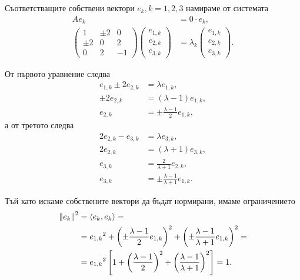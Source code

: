 \documentclass[
  headings=standardclasses,
  bibliography=totocnumbered,
]{scrartcl}
\begin{document}
\begin{solution}
  Съответстващите собствени вектори \( e_k, k = 1, 2, 3 \) намираме от системата
  \begingroup
  \allowdisplaybreaks
  \begin{align*}
    A e_k &= 0 \cdot e_k,
    \\
    \begin{pmatrix}
      1 & \pm 2 & 0 \\
      \pm 2 & 0 & 2 \\
      0 & 2 & -1
    \end{pmatrix}
    \begin{pmatrix}
      e_{1,k} \\ e_{2,k} \\ e_{3,k}
    \end{pmatrix}
    &=
    \lambda_k
    \begin{pmatrix}
      e_{1,k} \\ e_{2,k} \\ e_{3,k}
    \end{pmatrix}.
  \end{align*}
  \endgroup

  От първото уравнение следва
  \begin{align*}
    e_{1,k} \pm 2 e_{2,k} &= \lambda e_{1,k},
    \\
    \pm 2 e_{2,k} &= (\lambda - 1) e_{1,k},
    \\
    e_{2,k} &= \pm \frac {\lambda - 1} 2 e_{1,k},
  \end{align*}
  а от третото следва
  \begin{align*}
    2e_{2,k} - e_{3,k} &= \lambda e_{3,k},
    \\
    2 e_{2,k} &= (\lambda + 1) e_{3,k},
    \\
    e_{3,k} &= \frac 2 {\lambda + 1} e_{2,k},
    \\
    e_{3,k} &= \pm \frac {\lambda - 1} {\lambda + 1} e_{1,k}.
  \end{align*}

  Тъй като искаме собствените вектори да бъдат нормирани, имаме ограничението
  \begin{align*}
    {\left\Vert e_k \right\Vert}^2
    &=
    \left\langle e_k, e_k \right\rangle
    = \\ &=
    {e_{1,k}}^2 + {\left(\pm \frac {\lambda - 1} 2 e_{1,k} \right)}^2 + {\left(\pm \frac {\lambda - 1} {\lambda + 1} e_{1,k} \right)}^2
    = \\ &=
    {e_{1,k}}^2 \left[1 + {\left(\frac {\lambda - 1} 2 \right)}^2 + {\left(\frac {\lambda - 1} {\lambda + 1} \right)}^2 \right]
    =
    1.
  \end{align*}


\end{solution}
\end{document}
